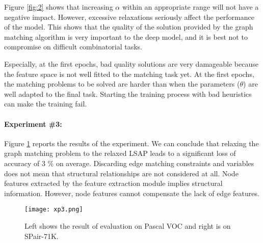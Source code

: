 \documentclass[times,onecolumn,final,authoryear]{article}
\theoremstyle{definition}
\begin{document}
Figure \ref{fig:2} shows that increasing $\alpha$ within an appropriate range will not have a negative impact. However, excessive relaxations seriously affect the performance of the model. This shows that the quality of the solution provided by the graph matching algorithm is very important to the deep model, and it is best not to compromise on difficult combinatorial tasks. 

Especially, at the first epochs, bad quality solutions are very damageable because the feature space is not well fitted to the matching task yet. At the first epochs, the matching problems to be solved are harder than when the parameters ($\theta$) are well adapted to the final task. Starting the training process with bad heuristics can make the training fail.

\paragraph{Experiment \#3: }
Figure \ref{fig:3} reports the results of the experiment. We can conclude that relaxing the graph matching problem to the relaxed LSAP leads to a significant loss of accuracy of 3 \% on average. Discarding edge matching constraints and variables does not mean that structural relationships are not considered at all. Node features extracted by the feature extraction module implies structural information. However, node features cannot compensate the lack of edge features.



\begin{figure}[htbp]
    \centering
    \texttt{[image: xp3.png]}
    \caption{Left shows the result of evaluation on Pascal VOC and right is on SPair-71K.}
    \label{fig:3}
\end{figure}
\end{document}
